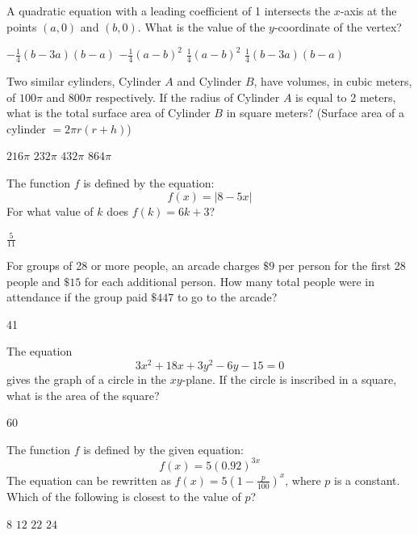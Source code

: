 \newpage




\question[1]
A quadratic equation with a leading coefficient of 1 intersects the $x$-axis at the points $(a, 0)$ and $(b, 0)$. What is the value of the $y$-coordinate of the vertex?
\begin{choices}
  \choice $-\frac{1}{4}(b-3 a)(b-a)$
  \CorrectChoice $-\frac{1}{4}(a-b)^2$
  \choice $\frac{1}{4}(a-b)^2$
  \choice $\frac{1}{4}(b-3 a)(b-a)$
\end{choices}

\question[1]
Two similar cylinders, Cylinder $A$ and Cylinder $B$, have volumes, in cubic meters, of $100 \pi$ and $800 \pi$ respectively. If the radius of Cylinder $A$ is equal to 2 meters, what is the total surface area of Cylinder $B$ in square meters? (Surface area of a cylinder $=2 \pi r(r+h)$)
\begin{choices}
  \choice $216 \pi$
  \choice $232 \pi$
  \CorrectChoice $432 \pi$
  \choice $864 \pi$
\end{choices}






\newpage



\question[1]
The function $f$ is defined by the equation:
\[
  f(x) = |8 - 5x|
\]
For what value of $k$ does $f(k) = 6k + 3$?
\begin{solution}
$\frac{5}{11}$
\end{solution}

\question[1]
For groups of 28 or more people, an arcade charges $\$9$ per person for the first 28 people and $\$15$ for each additional person. How many total people were in attendance if the group paid $\$447$ to go to the arcade?
\begin{solution}
41
\end{solution}

\question[1]
The equation
\[
  3 x^2+18 x+3 y^2-6 y-15=0
\]
gives the graph of a circle in the $xy$-plane. If the circle is inscribed in a square, what is the area of the square?
\begin{solution}
60
\end{solution}






\newpage







\question[1]
The function $f$ is defined by the given equation:
\[
  f(x)=5(0.92)^{3 x}
\]
The equation can be rewritten as $f(x)=5\left(1-\frac{p}{100}\right)^x$, where $p$ is a constant. Which of the following is closest to the value of $p$?
\begin{choices}
  \choice $8$
  \choice $12$
  \CorrectChoice $22$
  \choice $24$
\end{choices}

